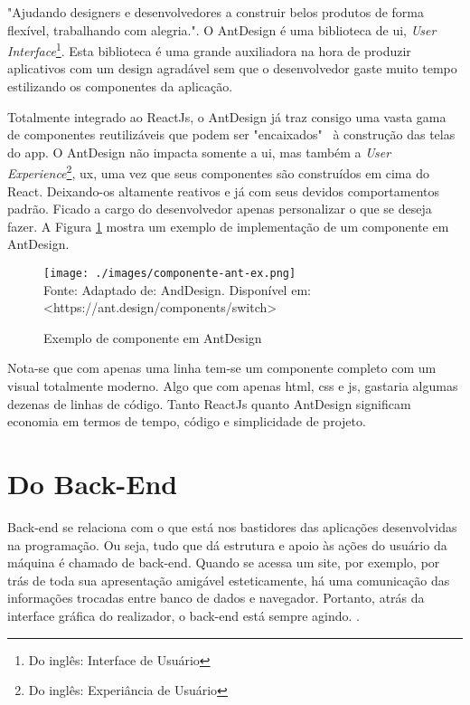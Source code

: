 "Ajudando designers e desenvolvedores a construir belos produtos de forma flexível, trabalhando com alegria.".
O AntDesign é uma biblioteca de
\acrshort{ui},
\textit{User Interface}\footnote{Do inglês: Interface de Usuário
}.
Esta biblioteca é uma grande auxiliadora na hora de produzir aplicativos
com um design agradável sem que o desenvolvedor gaste muito tempo
estilizando os componentes da aplicação.

Totalmente integrado ao ReactJs, o AntDesign já traz consigo uma vasta
gama de componentes reutilizáveis que podem ser "encaixados"~ à
construção das telas do app.
O AntDesign não impacta somente a
\acrshort{ui},
mas também a
\textit{User Experience}\footnote{Do inglês: Experiância de Usuário
},
\acrshort{ux}, uma vez que seus componentes são construídos
em cima do React. Deixando-os altamente reativos e já com seus
devidos comportamentos padrão. Ficado a cargo do desenvolvedor
apenas personalizar o que se deseja fazer.
A
Figura \ref{fig:componente-ant-ex}
mostra um exemplo de implementação de um componente em AntDesign.

\begin{figure}[H]
    \centering
    \caption{Exemplo de componente em AntDesign}
    \texttt{[image: ./images/componente-ant-ex.png]}
    \label{fig:componente-ant-ex} \\
    \textnormal{\fontsize{10pt}{12pt}Fonte: Adaptado de: AndDesign. Disponível em: <https://ant.design/components/switch>}
\end{figure}

Nota-se que com apenas uma linha tem-se um componente completo com
um visual totalmente moderno. Algo que com apenas
\acrshort{html},
\acrshort{css}
e
\acrshort{js},
gastaria algumas dezenas de linhas de código.
Tanto ReactJs quanto AntDesign significam economia
em termos de tempo, código e simplicidade de projeto.

\section{Do Back-End}

Back-end se relaciona com o que está nos bastidores das aplicações desenvolvidas na programação. Ou seja, tudo que dá estrutura e apoio às ações do usuário da máquina é chamado de back-end. Quando se acessa um site, por exemplo, por trás de toda sua apresentação amigável esteticamente, há uma comunicação das informações trocadas entre banco de dados e navegador. Portanto, atrás da interface gráfica do realizador, o back-end está sempre agindo.
\cite{totvs-back-end}.

